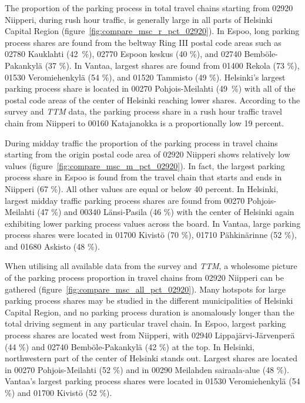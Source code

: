 The proportion of the parking process in total travel chains starting from 02920 Niipperi, during rush hour traffic, is generally large in all parts of Helsinki Capital Region (figure~\ref{fig:compare_msc_r_pct_02920}). In Espoo, long parking process shares are found from the beltway Ring III postal code areas such as 02780 Kauklahti (42~\%), 02770 Espoon keskus (40 \%), and 02740 Bemböle-Pakankylä (37 \%). In Vantaa, largest shares are found from 01400 Rekola (73 \%), 01530 Veromiehenkylä (54 \%), and 01520 Tammisto (49 \%). Helsinki's largest parking process share is located in 00270 Pohjois-Meilahti (49~\%) with all of the postal code areas of the center of Helsinki reaching lower shares. According to the survey and \textit{TTM} data, the parking process share in a rush hour traffic travel chain from Niipperi to 00160 Katajanokka is a proportionally low 19 percent.

During midday traffic the proportion of the parking process in travel chains starting from the origin postal code area of 02920 Niipperi shows relatively low values (figure~\ref{fig:compare_msc_m_pct_02920}). In fact, the largest parking process share in Espoo is found from the travel chain that starts and ends in Niipperi (67 \%). All other values are equal or below 40 percent. In Helsinki, largest midday traffic parking process shares are found from 00270 Pohjois-Meilahti (47 \%) and 00340 Länsi-Pasila (46 \%) with the center of Helsinki again exhibiting lower parking process values across the board. In Vantaa, large parking process shares were located in 01700 Kivistö (70 \%), 01710 Pähkinärinne (52 \%), and 01680 Askisto (48 \%).

When utilising all available data from the survey and \textit{TTM}, a wholesome picture of the parking process proportion in travel chains from 02920 Niipperi can be gathered (figure~\ref{fig:compare_msc_all_pct_02920}). Many hotspots for large parking process shares may be studied in the different municipalities of Helsinki Capital Region, and no parking process duration is anomalously longer than the total driving segment in any particular travel chain. In Espoo, largest parking process shares are located west from Niipperi, with 02940 Lippajärvi-Järvenperä (44 \%) and 02740 Bemböle-Pakankylä (42 \%) at the top. In Helsinki, northwestern part of the center of Helsinki stands out. Largest shares are located in 00270 Pohjois-Meilahti (52 \%) and in 00290 Meilahden sairaala-alue (48 \%). Vantaa's largest parking process shares were located in 01530 Veromiehenkylä (54 \%) and 01700 Kivistö (52 \%). 

